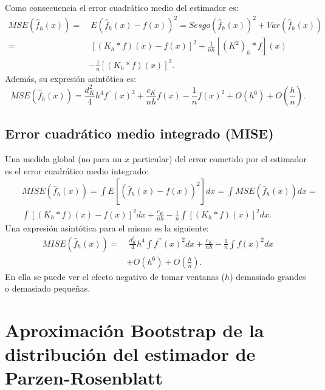 \documentclass[]{book}
\theoremstyle{definition}
\theoremstyle{definition}
\theoremstyle{definition}
\theoremstyle{remark}
\begin{document}
Como consecuencia el error cuadrático medio del estimador es:
\[\begin{aligned}
MSE\left( \hat{f}_{h}\left( x \right) \right) =&\ E\left( \hat{f}_{h}\left(
x \right) -f\left( x \right) \right)^2=Sesgo\left( \hat{f}_{h}\left(
x \right) \right)^2+Var\left( \hat{f}_{h}\left( x \right) \right) \\
=&\ \left[ \left( K_{h}\ast f \right) \left( x \right) -f\left( x \right) \right]
^2+\frac{1}{nh}\left[ \left( K^2 \right) _{h}\ast f\right] \left( x \right) \\
&-\frac{1}{n}\left[ \left( K_{h}\ast f \right) \left( x \right) \right]^2.
\end{aligned}\] Además, su expresión asintótica
es:\[MSE\left( \hat{f}_{h}\left( x \right) \right) =\frac{d_{K}^2}{4}
h^{4}f^{\prime \prime }\left( x \right)^2+\frac{c_{K}}{nh}f\left( x \right)
-\frac{1}{n}f\left( x \right)^2+O\left( h^{6} \right) +O\left( \frac{h}{n}
 \right).\]

\subsection{Error cuadrático medio integrado
(MISE)}\label{error-cuadratico-medio-integrado-mise}

Una medida global (no para un \(x\) particular) del error cometido por
el estimador es el error cuadrático medio integrado: \[\begin{aligned}
& & MISE\left( \hat{f}_{h}\left( x \right) \right) =\int E\left[ \left( \hat{f}
_{h}\left( x \right) -f\left( x \right) \right)^2\right] dx=\int MSE\left( 
\hat{f}_{h}\left( x \right) \right) dx= \\
&&\int \left[ \left( K_{h}\ast f \right) \left( x \right) -f\left( x \right) 
\right]^2dx+\frac{c_{K}}{nh}-\frac{1}{n}\int \left[ \left( K_{h}\ast
f \right) \left( x \right) \right]^2dx.
\end{aligned}\] Una expresión asintótica para el mismo es la siguiente:
\[\begin{aligned}
MISE\left( \hat{f}_{h}\left( x \right) \right) =&\ \frac{d_{K}^2}{4}h^4\int
f^{\prime \prime }\left( x \right)^2dx+\frac{c_{K}}{nh}-\frac{1}{n}\int
f\left( x \right)^2dx \\
&+O\left( h^{6} \right) +O \left( \frac{h}{n} \right).
\end{aligned}\] En ella se puede ver el efecto negativo de tomar
ventanas (\(h\)) demasiado grandes o demasiado pequeñas.

\section{Aproximación Bootstrap de la distribución del estimador de
Parzen-Rosenblatt}\label{aproximacion-bootstrap-de-la-distribucion-del-estimador-de-parzen-rosenblatt}
\end{document}
